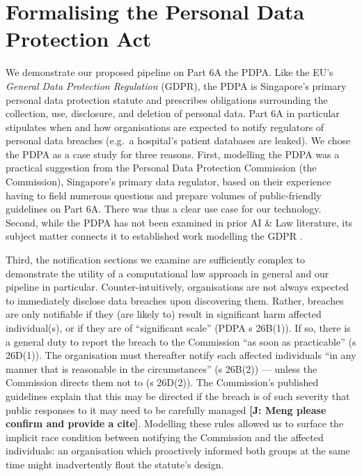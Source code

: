 \documentclass{IOS-Book-Article}
\newcommand{\todoj}[1]{{\color{red}\textbf{[J: #1]}}}
\begin{document}
\section{Formalising the Personal Data Protection Act}
\label{sec:pdpa}

We demonstrate our proposed pipeline on Part 6A the PDPA. Like the EU's \textit{General Data Protection Regulation} (GDPR), the PDPA is Singapore's primary personal data protection statute and prescribes obligations surrounding the collection, use, disclosure, and deletion of personal data. Part 6A in particular stipulates when and how organisations are expected to notify regulators of personal data breaches (e.g.\ a hospital's patient databases are leaked). We chose the PDPA as a case study for three reasons. First, modelling the PDPA was a practical suggestion from the Personal Data Protection Commission (the Commission), Singapore's primary data regulator, based on their experience having to field numerous questions and prepare volumes of public-friendly guidelines on Part 6A. There was thus a clear use case for our technology. Second, while the PDPA has not been examined in prior AI \& Law literature, its subject matter connects it to established work modelling the GDPR \cite{palmirani_modelling_2018, brennan_gdpr_2021, hickey_gdpr_2021}.

Third, the notification sections we examine are sufficiently complex to demonstrate the utility of a computational law approach in general and our pipeline in particular. Counter-intuitively, organisations are not always expected to immediately disclose data breaches upon discovering them. Rather, breaches are only notifiable if they (are likely to) result in significant harm affected individual(s), or if they are of ``significant scale'' (PDPA s 26B(1)). If so, there is a general duty to report the breach to the Commission ``as soon as practicable'' (s 26D(1)). The organisation must thereafter notify each affected individuals ``in any manner that is reasonable in the circumstances'' (s 26B(2)) --- unless the Commission directs them not to (s 26D(2)). The Commission's published guidelines explain that this may be directed if the breach is of such severity that public responses to it may need to be carefully managed
 \todoj{ Meng please confirm and provide a cite}.
 Modelling these rules allowed us to surface the implicit race condition between notifying the Commission and the affected individuals: an organisation which proactively informed both groups at the same time might inadvertently flout the statute's design.
\end{document}
